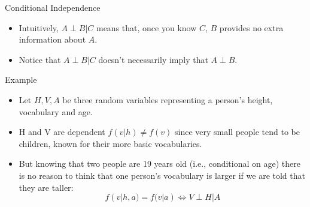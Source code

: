 \documentclass[handout]{beamer}
\begin{document}
\begin{frame}{Conditional Independence}
\scriptsize{

\begin{itemize}
 \item Intuitively, $A \perp B | C$ means that, once you know $C$, $B$ provides no extra information about $A$.

\item Notice that $A \perp B | C$ doesn't necessarily imply that $A \perp B$.
 
\end{itemize}



\begin{block}{Example}
\begin{itemize}
 \item Let $H,V,A$ be three random variables representing a person's height, vocabulary and age.
 \item H and V are dependent $f(v|h) \neq f(v)$ 
 since very small people tend to be children, known for their more basic vocabularies. 
 \item But knowing that two people are 19 years old (i.e., conditional on age) there is no reason to think that one person's vocabulary is larger if we are told that they are taller: 
 \begin{displaymath}
 f(v|h,a)=f(v|a) \Leftrightarrow V \perp H | A 
 \end{displaymath}

\end{itemize}


\end{block}





} 

\end{frame}
\end{document}
